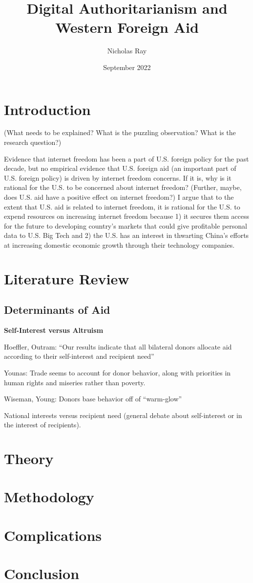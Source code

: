\documentclass{article}
\title{Digital Authoritarianism and Western Foreign Aid}
\author{Nicholas Ray}
\date{September 2022}
\begin{document}
\maketitle
\section*{Introduction}
(What needs to be explained? What is the puzzling observation? What is the research question?)

Evidence that internet freedom has been a part of U.S. foreign policy for the past decade, but no empirical evidence that U.S. foreign aid 
(an important part of U.S. foreign policy) is driven by internet freedom concerns. If it is, why is it rational for the U.S. to be concerned about internet freedom? (Further, maybe, does U.S. aid have a positive effect on internet freedom?) I argue that to the extent that U.S. aid is related to internet freedom, it is rational for the U.S. to expend resources on increasing internet freedom because 1) it secures them access for the future to developing country's markets that could give profitable personal data to U.S. Big Tech and 2) the U.S. has an interest in thwarting China's efforts at increasing domestic economic growth through their technology companies.

\section*{Literature Review}
\subsection*{Determinants of Aid}
\textbf{Self-Interest versus Altruism}

Hoeffler, Outram: ``Our results indicate that all bilateral donors allocate aid according to their self-interest and recipient need''

Younas: Trade seems to account for donor behavior, along with priorities in human rights and miseries rather than poverty.

Wiseman, Young: Donors base behavior off of ``warm-glow''

National interests versus recipient need (general debate about self-interest or in the interest of recipients).


\section*{Theory}


\section*{Methodology}


\section*{Complications}
 

\section*{Conclusion}


\pagebreak
\printbibliography
\end{document}
